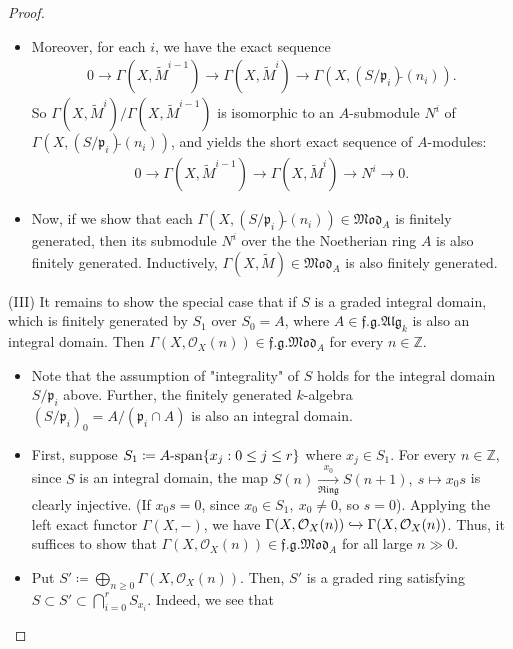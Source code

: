 \documentclass[11pt,a4paper,footinclude=true,headinclude=true]{scrbook} %
\newcommand{\OO}{\mathcal{O}}
\newcommand{\pp}{\mathfrak{p}}
\newcommand{\Ring}{\mathfrak{Ring}}
\newcommand{\<}{\langle}
\newcommand{\>}{\rangle}
\newcommand{\spn}{\mathchar`-\mathrm{span}}
\newcommand{\fg}{\mathfrak{f.g.}}
\newcommand{\MOD}{\mathfrak{Mod}}
\newcommand{\ALG}{\mathfrak{Alg}}
\begin{document}
\begin{proof}
\begin{itemize}
\begin{align*}
            0=\Gamma(X,\widetilde{M}^0)\subset\Gamma(X,\widetilde{M}^1)\subset\cdots\subset\Gamma(X,\widetilde{M}^r)=\Gamma(X,\widetilde{M})
        \end{align*}
        in $\MOD_{S_0}=\MOD_A$.
        \item Moreover, for each $i$, we have the exact sequence
        \begin{align*}
            0\to\Gamma(X,\widetilde{M}^{i-1})\to\Gamma(X,\widetilde{M}^i)\to\Gamma(X,(S/\pp_i)\widetilde{}(n_i)).
        \end{align*}
        So $\Gamma(X,\widetilde{M}^i)/\Gamma(X,\widetilde{M}^{i-1})$ is isomorphic to an $A$-submodule $N^i$ of $\Gamma(X,(S/\pp_i)\widetilde{}(n_i))$, and yields the short exact sequence of $A$-modules:
        \begin{align*}
            0\to\Gamma(X,\widetilde{M}^{i-1})\to\Gamma(X,\widetilde{M}^i)\to N^i\to0.
        \end{align*}
        \item Now, if we show that each $\Gamma(X,(S/\pp_i)\widetilde{}(n_i))\in \MOD_A$ is finitely generated, then its submodule $N^i$ over the the Noetherian ring $A$ is also finitely generated. Inductively, $\Gamma(X,\widetilde{M})\in \MOD_A$ is also finitely generated.
    \end{itemize}
    (III) It remains to show the special case that if $S$ is a graded integral domain, which is finitely generated by $S_1$ over $S_0=A$, where $A\in\fg\ALG_k$ is also an integral domain. Then $\Gamma(X,\OO_X(n))\in\fg\MOD_A$ for every $n\in\mathbb{Z}$.
    \begin{itemize}
        \item Note that the assumption of "integrality" of $S$ holds for the integral domain $S/\pp_i$ above. Further, the finitely generated $k$-algebra $(S/\pp_i)_0=A/(\pp_i\cap A)$ is also an integral domain.
        \item First, suppose $S_1\coloneqq A\spn\{x_j:0\leq j\leq r\}$ where $x_j\in S_1$. For every $n\in\mathbb{Z}$, since $S$ is an integral domain, the map $S(n)\xrightarrow[\Ring]{x_0}S(n+1),\ s\mapsto x_0s$ is clearly injective. (If $x_0s=0$, since $x_0\in S_1,\ x_0\neq0$, so $s=0$). Applying the left exact functor $\Gamma(X,-)$, we have $\Gamma(X,\OO_X(n))\xhookrightarrow{}\Gamma(X,\OO_X(n))$. Thus, it suffices to show that $\Gamma(X,\OO_X(n))\in\fg\MOD_A$ for all large $n\gg0$.
        \item Put $S'\coloneqq\bigoplus_{n\geq0}\Gamma(X,\OO_X(n))$. Then, $S'$ is a graded ring satisfying $S\subset S'\subset\bigcap_{i=0}^rS_{x_i}$. Indeed, we see that

\end{itemize}
\end{proof}
\end{document}
